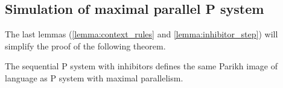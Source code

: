 
\subsection{Simulation of maximal parallel P system} %
\label{sub:simulation_of_maximal_parallel_p_system}

The last lemmas (\ref{lemma:context_rules} and \ref{lemma:inhibitor_step}) will simplify the proof of the following theorem.

\begin{veta}
  The sequential P system with inhibitors defines the same Parikh image of language as P system with maximal parallelism.
\end{veta}

